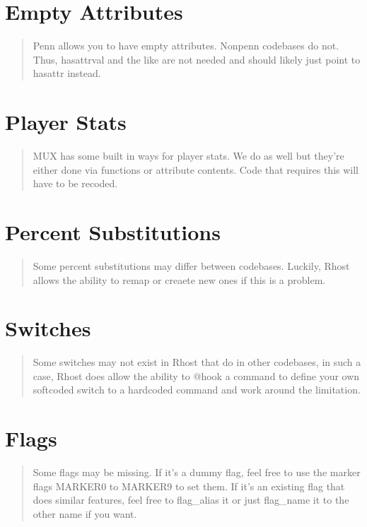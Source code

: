 \documentclass[letterpaper,10pt,english]{sphinxmanual}
\begin{document}
\section{Empty Attributes}
\label{\detokenize{10-customize:empty-attributes}}\begin{quote}

\sphinxAtStartPar
Penn allows you to have empty attributes.  Non\sphinxhyphen{}penn codebases do not.
Thus, hasattrval and the like are not needed and should likely just point
to hasattr instead.
\end{quote}


\section{Player Stats}
\label{\detokenize{10-customize:player-stats}}\begin{quote}

\sphinxAtStartPar
MUX has some built in ways for player stats.  We do as well but they’re
either done via functions or attribute contents.  Code that requires this
will have to be recoded.
\end{quote}


\section{Percent Substitutions}
\label{\detokenize{10-customize:percent-substitutions}}\begin{quote}

\sphinxAtStartPar
Some percent substitutions may differ between codebases.  Luckily, Rhost
allows the ability to remap or creaete new ones if this is a problem.
\end{quote}


\section{Switches}
\label{\detokenize{10-customize:switches}}\begin{quote}

\sphinxAtStartPar
Some switches may not exist in Rhost that do in other codebases, in such
a case, Rhost does allow the ability to @hook a command to define your own
softcoded switch to a hardcoded command and work around the limitation.
\end{quote}


\section{Flags}
\label{\detokenize{10-customize:flags}}\begin{quote}

\sphinxAtStartPar
Some flags may be missing.  If it’s a dummy flag, feel free to use the
marker flags MARKER0 to MARKER9 to set them.  If it’s an existing flag
that does similar features, feel free to flag\_alias it or just flag\_name
it to the other name if you want.
\end{quote}
\end{document}
